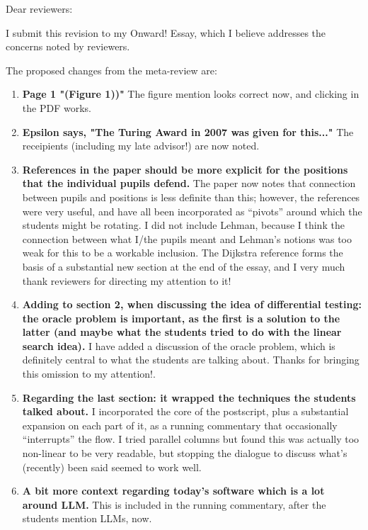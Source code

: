 \documentclass{letter}
\begin{document}
\begin{letter}{}
\opening{Dear reviewers:}

I submit this revision to my Onward! Essay, which I believe addresses the concerns noted by reviewers.

The proposed changes from the meta-review are:

\begin{enumerate}

\item {\bf Page 1 "(Figure 1))"} The figure mention looks correct now, and clicking in the PDF works.

\item {\bf Epsilon says, "The Turing Award in 2007 was given for this..."}  The receipients (including my late advisor!) are now noted.

\item {\bf  References in the paper should be more explicit for the positions that the individual pupils defend.}  The paper now notes that connection between pupils and positions is less definite than this; however, the references were very useful, and have all been incorporated as ``pivots'' around which the students might be rotating.  I did not include Lehman, because I think the connection between what I/the pupils meant and Lehman's notions was too weak for this to be a workable inclusion.  The Dijkstra reference forms the basis of a substantial new section at the end of the essay, and I very much thank reviewers for directing my attention to it!

\item {\bf Adding to section 2, when discussing the idea of differential testing: the oracle problem is important, as the first is a solution to the latter (and maybe what the students tried to do with the linear search idea).}  I have added a discussion of the oracle problem, which is definitely central to what the students are talking about.  Thanks for bringing this omission to my attention!.

\item {\bf Regarding the last section: it wrapped the techniques the students talked about.}  I incorporated the core of the postscript, plus a substantial expansion on each part of it, as a running commentary that occasionally ``interrupts'' the flow.  I tried parallel columns but found this was actually too non-linear to be very readable, but stopping the dialogue to discuss what's (recently) been said seemed to work well.

\item {\bf A bit more context regarding today's software which is a lot around LLM.}  This is included in the running commentary, after the students mention LLMs, now.


\end{enumerate}
\end{letter}
\end{document}
